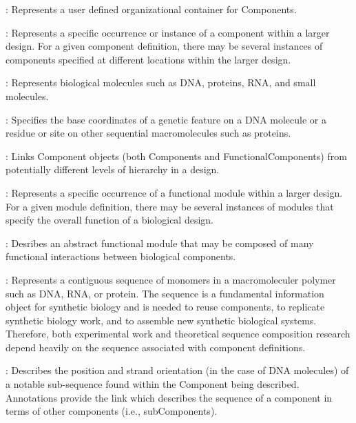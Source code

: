 \begin{description}

\item \emph{}:
Represents a user defined organizational container for Components.

\item \emph{}:
Represents a specific occurrence or instance of a component within a larger design.  For a given component definition, there may be several instances of components specified at different locations within the larger design.

\item \emph{}: Represents biological molecules such as DNA, proteins, RNA, and small molecules.


\item \emph{}:
Specifies the base coordinates of a genetic feature on a DNA molecule or a residue or site on other sequential macromolecules such as proteins.

\item \emph{}:
Links Component objects (both Components and FunctionalComponents) from potentially different levels of hierarchy in a design.

\item \emph{}:
Represents a specific occurrence of a functional module within a larger design.  For a given module definition, there may be several instances of modules that specify the overall function of a biological design.


\item \emph{}:
Desribes an abstract functional module that may be composed of many functional interactions between biological components.

\item \emph{}:
Represents a contiguous sequence of monomers in a macromoleculer polymer such as DNA, RNA, or protein. The
sequence is a fundamental information object for synthetic biology and is needed to reuse components, to replicate synthetic biology work, and to assemble new synthetic biological systems. Therefore, both experimental work and theoretical sequence composition research depend heavily on the sequence associated with component definitions.

\item \emph{}:
Describes the position and strand orientation (in the case of DNA molecules) of a notable sub-sequence found within the Component being
described. Annotations provide the link which describes the 
sequence of a component in terms of other components (i.e.,
subComponents).


\end{description}
